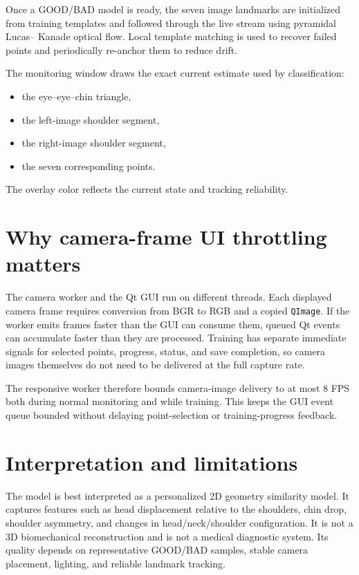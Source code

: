 \documentclass[11pt,a4paper]{article}
\begin{document}
Once a GOOD/BAD model is ready, the seven image landmarks are initialized from
training templates and followed through the live stream using pyramidal Lucas--
Kanade optical flow. Local template matching is used to recover failed points
and periodically re-anchor them to reduce drift.

The monitoring window draws the exact current estimate used by classification:
\begin{itemize}[leftmargin=2em]
    \item the eye--eye--chin triangle,
    \item the left-image shoulder segment,
    \item the right-image shoulder segment,
    \item the seven corresponding points.
\end{itemize}
The overlay color reflects the current state and tracking reliability.

\section{Why camera-frame UI throttling matters}

The camera worker and the Qt GUI run on different threads. Each displayed camera
frame requires conversion from BGR to RGB and a copied \texttt{QImage}. If the
worker emits frames faster than the GUI can consume them, queued Qt events can
accumulate faster than they are processed. Training has separate immediate
signals for selected points, progress, status, and save completion, so camera
images themselves do not need to be delivered at the full capture rate.

The responsive worker therefore bounds camera-image delivery to at most 8 FPS
both during normal monitoring and while training. This keeps the GUI event queue
bounded without delaying point-selection or training-progress feedback.

\section{Interpretation and limitations}

The model is best interpreted as a personalized 2D geometry similarity model. It
captures features such as head displacement relative to the shoulders, chin
drop, shoulder asymmetry, and changes in head/neck/shoulder configuration. It is
not a 3D biomechanical reconstruction and is not a medical diagnostic system.
Its quality depends on representative GOOD/BAD samples, stable camera placement,
lighting, and reliable landmark tracking.
\end{document}
